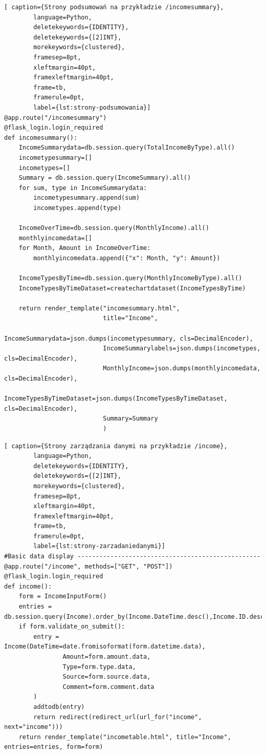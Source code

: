 \documentclass[a4paper,10pt, twoside]{report}
\begin{document}
\begin{large}
\begin{minipage}{\textwidth}
    \begin{lstlisting}[ caption={Strony podsumowań na przykładzie /incomesummary},
        language=Python,
        deletekeywords={IDENTITY},
        deletekeywords={[2]INT},
        morekeywords={clustered},
        framesep=8pt,
        xleftmargin=40pt,
        framexleftmargin=40pt,
        frame=tb,
        framerule=0pt,
        label={lst:strony-podsumowania}]
@app.route("/incomesummary")
@flask_login.login_required
def incomesummary():
    IncomeSummarydata=db.session.query(TotalIncomeByType).all()
    incometypesummary=[]
    incometypes=[]
    Summary = db.session.query(IncomeSummary).all()
    for sum, type in IncomeSummarydata:
        incometypesummary.append(sum)
        incometypes.append(type)

    IncomeOverTime=db.session.query(MonthlyIncome).all()
    monthlyincomedata=[]
    for Month, Amount in IncomeOverTime:
        monthlyincomedata.append({"x": Month, "y": Amount})

    IncomeTypesByTime=db.session.query(MonthlyIncomeByType).all()
    IncomeTypesByTimeDataset=createchartdataset(IncomeTypesByTime)

    return render_template("incomesummary.html",
                           title="Income",
                           IncomeSummarydata=json.dumps(incometypesummary, cls=DecimalEncoder),
                           IncomeSummarylabels=json.dumps(incometypes, cls=DecimalEncoder),
                           MonthlyIncome=json.dumps(monthlyincomedata, cls=DecimalEncoder),
                           IncomeTypesByTimeDataset=json.dumps(IncomeTypesByTimeDataset, cls=DecimalEncoder),
                           Summary=Summary
                           )\end{lstlisting}
\end{minipage}

\begin{minipage}{\textwidth}
    \begin{lstlisting}[ caption={Strony zarządzania danymi na przykładzie /income},
        language=Python,
        deletekeywords={IDENTITY},
        deletekeywords={[2]INT},
        morekeywords={clustered},
        framesep=8pt,
        xleftmargin=40pt,
        framexleftmargin=40pt,
        frame=tb,
        framerule=0pt,
        label={lst:strony-zarzadaniedanymi}]
#Basic data display --------------------------------------------------
@app.route("/income", methods=["GET", "POST"])
@flask_login.login_required
def income():
    form = IncomeInputForm()
    entries = db.session.query(Income).order_by(Income.DateTime.desc(),Income.ID.desc()).all()
    if form.validate_on_submit():
        entry = Income(DateTime=date.fromisoformat(form.datetime.data),
                Amount=form.amount.data,
                Type=form.type.data,
                Source=form.source.data,
                Comment=form.comment.data
        )
        addtodb(entry)
        return redirect(redirect_url(url_for("income", next="income")))
    return render_template("incometable.html", title="Income", entries=entries, form=form)\end{lstlisting}
\end{minipage}


\end{large}
\end{document}
